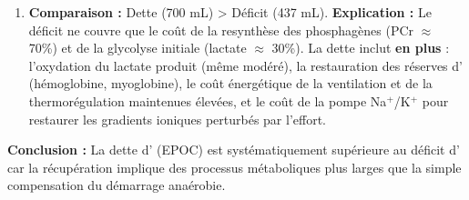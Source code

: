 \documentclass[11pt]{article}
\begin{document}
\begin{exoresolu}
\begin{enumerate}
              \[ \text{EPOC} = \int_0^{300} 17,5 e^{-t/40} dt = 17,5 \times \left[ -40 e^{-t/40} \right]_0^{300} = 700 \times (1 - e^{-7,5}) \approx \mathbf{700\ mL} \]
        \item \textbf{Comparaison :} Dette (700 mL) > Déficit (437 mL).
              \textbf{Explication :} Le déficit ne couvre que le coût de la resynthèse des phosphagènes (PCr $\approx$ 70\%) et de la glycolyse initiale (lactate $\approx$ 30\%). La dette inclut \textbf{en plus} : l'oxydation du lactate produit (même modéré), la restauration des réserves d' (hémoglobine, myoglobine), le coût énergétique de la ventilation et de la thermorégulation maintenues élevées, et le coût de la pompe Na$^+$/K$^+$ pour restaurer les gradients ioniques perturbés par l'effort.
    \end{enumerate}
    \textbf{Conclusion :} La dette d' (EPOC) est systématiquement supérieure au déficit d' car la récupération implique des processus métaboliques plus larges que la simple compensation du démarrage anaérobie.
\end{exoresolu}
\end{document}
